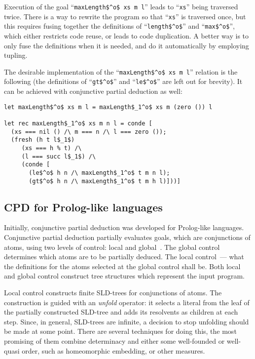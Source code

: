 Execution of the goal ``\lstinline{maxLength$^o$ xs m l}'' leads to ``\lstinline{xs}'' being traversed twice. 
There is a way to rewrite the program so that ``\lstinline{xs}'' is traversed once, but this requires fusing together the definitions of ``\lstinline{length$^o$}'' and ``\lstinline{max$^o$}'', which either restricts code reuse, or leads to code duplication. 
A better way is to only fuse the definitions when it is needed, and do it automatically by employing tupling. 

The desirable implementation of the ``\lstinline{maxLength$^o$ xs m l}'' relation is the following (the definitions of ``\lstinline{gt$^o$}'' and ``\lstinline{le$^o$}'' are left out for brevity). It can be achieved with conjunctive partial deduction as well: 

\begin{lstlisting}[label={cpd:maxlen}]
let maxLength$^o$ xs m l = maxLength$_1^o$ xs m (zero ()) l

let rec maxLength$_1^o$ xs m n l = conde [
  (xs === nil () /\ m === n /\ l === zero ());
  (fresh (h t l$_1$)
     (xs === h % t) /\
     (l === succ l$_1$) /\
     (conde [
       (le$^o$ h n /\ maxLength$_1^o$ t m n l);
       (gt$^o$ h n /\ maxLength$_1^o$ t m h l)]))]
\end{lstlisting}

\subsection{CPD for Prolog-like languages}

Initially, conjunctive partial deduction was developed for Prolog-like languages.
Conjunctive partial deduction partially evaluates goals, which are conjunctions of atoms, using two levels of control: local and global~\cite{gluck1996controlling}. The global control determines which atoms are to be partially deduced. The local control~--- what the definitions for the atoms selected at the global control shall be.
Both local and global control construct tree structures which represent the input program. 

Local control constructs finite SLD-trees for conjunctions of atoms. 
The construction is guided with an \emph{unfold} operator: it selects a literal from the leaf of the partially constructed SLD-tree and adds its resolvents as children at each step.
Since, in general, SLD-trees are infinite, a decision to stop unfolding should be made at some point. 
There are several techniques for doing this, the most promising of them combine determinacy and either some well-founded or well-quasi order, such as homeomorphic embedding, or other measures. 


